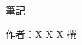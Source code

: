\fontsize{24}{20pt}\selectfont
\thispagestyle{empty}


\vspace*{1cm}

\vspace*{\fill}
\begin{center}
	\fontsize{24}{18pt}
	\LARGE 筆記 \\

\end{center}
\vspace*{\fill}



\vspace*{0.5cm}

\begin{center}
	\fontsize{24}{18pt}
	\LARGE 作者：X X X   撰\\
\end{center}

\vspace*{0.5cm}


\newpage

